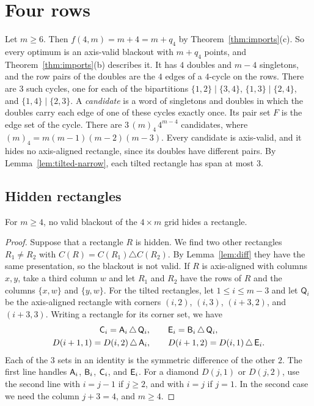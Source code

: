 \section{Four rows}\label{sec:four}

Let $m\ge6$. Then $f(4,m)=m+4=m+q_4$ by Theorem~\ref{thm:imports}(c). So every
optimum is an axis-valid blackout with $m+q_4$ points, and
Theorem~\ref{thm:imports}(b) describes it. It has $4$ doubles and $m-4$
singletons, and the row pairs of the doubles are the $4$ edges of a $4$-cycle
on the rows. There are $3$ such cycles, one for each of the bipartitions
$\{1,2\}\mid\{3,4\}$, $\{1,3\}\mid\{2,4\}$, and $\{1,4\}\mid\{2,3\}$. A
\emph{candidate} is a word of singletons and doubles in which the doubles carry
each edge of one of these cycles exactly once. Its pair set $F$ is the edge set
of the cycle. There are $3\,(m)_4\,4^{m-4}$ candidates, where
$(m)_4=m(m-1)(m-2)(m-3)$. Every candidate is axis-valid, and it hides no
axis-aligned rectangle, since its doubles have different pairs. By
Lemma~\ref{lem:tilted-narrow}, each tilted rectangle has span at most $3$.

\subsection{Hidden rectangles}

\begin{theorem}\label{thm:hidden}
For $m\ge4$, no valid blackout of the $4\times m$ grid hides a rectangle.
\end{theorem}

\begin{proof}
Suppose that a rectangle $R$ is hidden. We find two other rectangles
$R_1\ne R_2$ with $C(R)=C(R_1)\triangle C(R_2)$. By Lemma~\ref{lem:diff} they
have the same presentation, so the blackout is not valid. If $R$ is
axis-aligned with columns $x,y$, take a third column $w$ and let $R_1$ and $R_2$
have the rows of $R$ and the columns $\{x,w\}$ and $\{y,w\}$. For the tilted
rectangles, let $1\le i\le m-3$ and let $\mathsf Q_i$ be the axis-aligned
rectangle with corners $(i,2)$, $(i,3)$, $(i+3,2)$, and $(i+3,3)$. Writing a
rectangle for its corner set, we have
\begin{equation}\label{eq:fourxor}
\begin{gathered}
\mathsf{C}_i=\mathsf{A}_i\,\triangle\,\mathsf Q_i,\qquad \mathsf{E}_i=\mathsf{B}_i\,\triangle\,\mathsf Q_i,\\
D(i+1,1)=D(i,2)\,\triangle\,\mathsf{A}_i,\qquad D(i+1,2)=D(i,1)\,\triangle\,\mathsf{E}_i .
\end{gathered}
\end{equation}
Each of the $3$ sets in an identity is the symmetric difference of the other
$2$. The first line handles $\mathsf{A}_i$, $\mathsf{B}_i$, $\mathsf{C}_i$, and $\mathsf{E}_i$. For a
diamond $D(j,1)$ or $D(j,2)$, use the second line with $i=j-1$ if $j\ge2$, and
with $i=j$ if $j=1$. In the second case we need the column $j+3=4$, and
$m\ge4$.
\end{proof}

